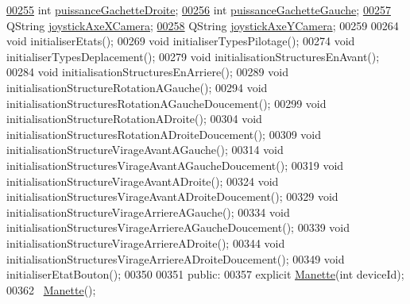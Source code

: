 \begin{DoxyCode}
\hyperlink{class_manette_a135a3a6f567bbeeefd69b3a020f9f040}{00255}     \textcolor{keywordtype}{int} \hyperlink{class_manette_a135a3a6f567bbeeefd69b3a020f9f040}{puissanceGachetteDroite};             
\hyperlink{class_manette_ab777328c9b35454ab45ed5e0b0a5f234}{00256}     \textcolor{keywordtype}{int} \hyperlink{class_manette_ab777328c9b35454ab45ed5e0b0a5f234}{puissanceGachetteGauche};             
\hyperlink{class_manette_a0ca05a5c08455e74c8d944b96d8124a6}{00257}     QString \hyperlink{class_manette_a0ca05a5c08455e74c8d944b96d8124a6}{joystickAxeXCamera};              
\hyperlink{class_manette_ab635d71c9e829d8950b9bbd13b9cdb01}{00258}     QString \hyperlink{class_manette_ab635d71c9e829d8950b9bbd13b9cdb01}{joystickAxeYCamera};              
00259 
00264     \textcolor{keywordtype}{void} initialiserEtats();
00269     \textcolor{keywordtype}{void} initialiserTypesPilotage();
00274     \textcolor{keywordtype}{void} initialiserTypesDeplacement();
00279     \textcolor{keywordtype}{void} initialisationStructuresEnAvant();
00284     \textcolor{keywordtype}{void} initialisationStructuresEnArriere();
00289     \textcolor{keywordtype}{void} initialisationStructureRotationAGauche();
00294     \textcolor{keywordtype}{void} initialisationStructuresRotationAGaucheDoucement();
00299     \textcolor{keywordtype}{void} initialisationStructureRotationADroite();
00304     \textcolor{keywordtype}{void} initialisationStructuresRotationADroiteDoucement();
00309     \textcolor{keywordtype}{void} initialisationStructureVirageAvantAGauche();
00314     \textcolor{keywordtype}{void} initialisationStructuresVirageAvantAGaucheDoucement();
00319     \textcolor{keywordtype}{void} initialisationStructureVirageAvantADroite();
00324     \textcolor{keywordtype}{void} initialisationStructuresVirageAvantADroiteDoucement();
00329     \textcolor{keywordtype}{void} initialisationStructureVirageArriereAGauche();
00334     \textcolor{keywordtype}{void} initialisationStructuresVirageArriereAGaucheDoucement();
00339     \textcolor{keywordtype}{void} initialisationStructureVirageArriereADroite();
00344     \textcolor{keywordtype}{void} initialisationStructuresVirageArriereADroiteDoucement();
00349     \textcolor{keywordtype}{void} initialiserEtatBouton();
00350 
00351 \textcolor{keyword}{public}:
00357     \textcolor{keyword}{explicit} \hyperlink{class_manette}{Manette}(\textcolor{keywordtype}{int} deviceId);
00362     ~\hyperlink{class_manette}{Manette}();

\end{DoxyCode}
